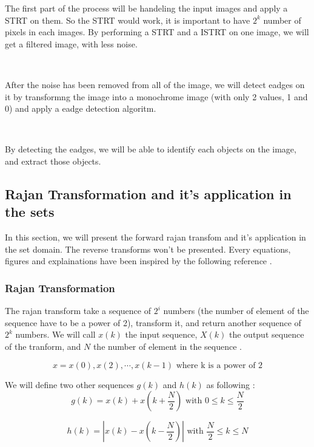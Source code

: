 \documentclass[11pt,a4paper]{article}
\begin{document}
The first part of the process will be handeling the input images and apply a \gls{STRT} on them. So the \gls{STRT} would work, it is important to have $2^{k}$ number of pixels in each images. By performing a \gls{STRT} and a \gls{ISTRT} on one image, we will get a filtered image, with less noise.

~~ 

After the noise has been removed from all of the image, we will detect eadges on it by  transformng the image into a monochrome image (with only 2 values, 1 and 0) and apply a eadge detection algoritm. 

~~ 

By detecting the eadges, we will be able to identify each objects on the image, and extract those objects. 



\subsection{Rajan Transformation and it's application in the sets }

In this section, we will present the forward rajan transfom and it's application in the set domain. The reverse transforms won't be presented. Every equations, figures and explainations have been inspired by the following reference  \cite{bib:rajan_transformation}.


\subsubsection{Rajan Transformation}

The rajan transform take a sequence of $2^{i}$ numbers (the number of element of the sequence have to be a power of 2), transform it, and return another sequence of $2^{k}$ numbers. We will call $x(k)$ the input sequence, $X(k)$ the output sequence of the tranform, and $N$ the number of element in the sequence \cite{bib:rajan_transformation}. 

\begin{equation}
x = x(0), x(2), \cdots, x(k-1) \text{ where k is a power of 2}
\end{equation}

We will define two other sequences $g(k)$ and $h(k)$ as following : 
\begin{equation}
g(k) = x(k) + x(k + \frac{N}{2}) \text{ with } 0 \leq k \leq \frac{N}{2}
\end{equation}

\begin{equation}
h(k) = | x(k) - x(k - \frac{N}{2}) | \text{ with } \frac{N}{2} \leq k \leq N
\end{equation}
\end{document}
